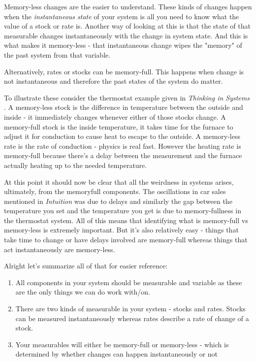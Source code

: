 \documentclass[11pt,a5paper]{book}
\begin{document}
Memory-less changes are the easier to understand. These kinds of changes happen when the \textit{instantaneous state} of your system is all you need to know what the value of a stock or rate is. Another way of looking at this is that the state of that measurable changes instantaneously with the change in system state. And this is what makes it memory-less - that instantaneous change wipes the "memory" of the past system from that variable.
\newline

Alternatively, rates or stocks can be memory-full. This happens when change is not instantaneous and therefore the past states of the system do matter. 
\newline

To illustrate these consider the thermostat example given in \textit{Thinking in Systems} \cite{meadows}. A memory-less stock is the difference in temperature between the outside and inside - it immediately changes whenever either of those stocks change. A memory-full stock is the inside temperature, it takes time for the furnace to adjust it for conduction to cause heat to escape to the outside. A memory-less rate is the rate of conduction - physics is real fast. However the heating rate is memory-full because there's a delay between the measurement and the furnace actually heating up to the needed temperature. 
\newline

At this point it should now be clear that all the weirdness in systems arises, ultimately, from the memoryfull components. The oscillations in car sales mentioned in \textit{Intuition} was due to delays and similarly the gap between the temperature you set and the temperature you get is due to memory-fullness in the thermostat system. All of this means that identifying what is memory-full vs memory-less is extremely important. But it's also relatively easy - things that take time to change or have delays involved are memory-full whereas things that act instantaneously are memory-less. 
\newline

Alright let's summarize all of that for easier reference:

\begin{enumerate}
\item All components in your system should be measurable and variable as these are the only things we can do work with/on.
\item There are two kinds of measurable in your system - stocks and rates. Stocks can be measured instantaneously whereas rates describe a rate of change of a stock.
\item Your measurables will either be memory-full or memory-less - which is determined by whether changes can happen instantaneously or not
\end{enumerate}
\end{document}
